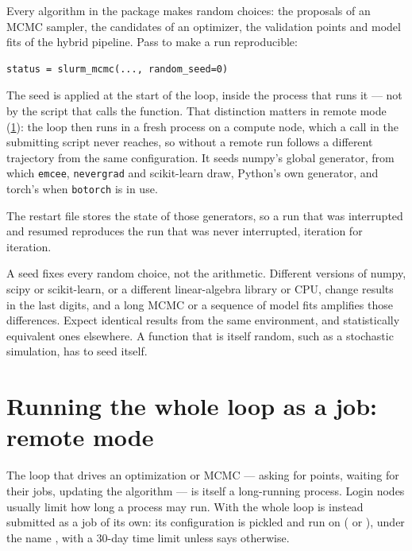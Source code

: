 Every algorithm in the package makes random choices: the proposals of an MCMC sampler, the
candidates of an optimizer, the validation points and model fits of the hybrid pipeline. Pass
 to make a run reproducible:
\begin{lstlisting}
status = slurm_mcmc(..., random_seed=0)
\end{lstlisting}
The seed is applied at the start of the loop, inside the process that runs it --- not by the
script that calls the function. That distinction matters in remote mode (\cref{sec:remote}): the
loop then runs in a fresh process on a compute node, which a  call in the
submitting script never reaches, so without  a remote run follows a different
trajectory from the same configuration. It seeds numpy's global generator, from which \texttt{emcee},
\texttt{nevergrad} and scikit-learn draw, Python's own generator, and torch's when \texttt{botorch}
is in use.

The restart file stores the state of those generators, so a run that was interrupted and resumed
reproduces the run that was never interrupted, iteration for iteration.

\begin{cautionbox}
A seed fixes every random choice, not the arithmetic. Different versions of numpy, scipy or
scikit-learn, or a different linear-algebra library or CPU, change results in the last digits, and a
long MCMC or a sequence of model fits amplifies those differences. Expect identical results from the
same environment, and statistically equivalent ones elsewhere. A function that is itself random, such
as a stochastic simulation, has to seed itself.
\end{cautionbox}

\section{Running the whole loop as a job: remote mode}
\label{sec:remote}

The loop that drives an optimization or MCMC --- asking for points, waiting for their jobs,
updating the algorithm --- is itself a long-running process. Login nodes usually limit how long a
process may run. With  the whole loop is instead submitted as a job of its own:
its configuration is pickled and run on  ( or ),
under the name , with a 30-day time limit unless
 says otherwise.


